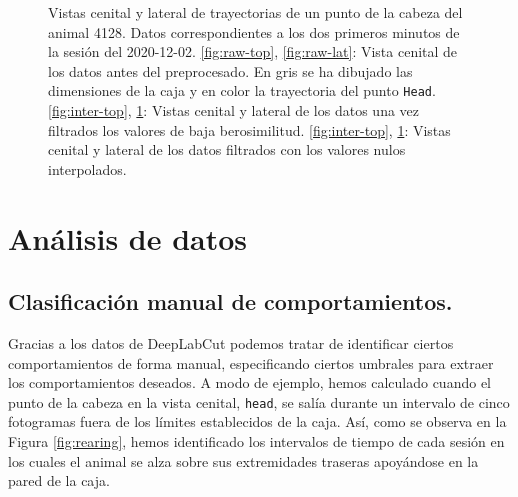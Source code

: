 \begin{figure}[p]
\begin{subfigure}{0.38\textwidth}
    \caption{}
    \label{fig:inter-lat}
  \end{subfigure}
  \caption[Trayectorias durante el preprocesamiento.]{Vistas cenital y lateral de trayectorias de un punto de la cabeza del animal 4128. Datos correspondientes a los dos primeros minutos de la sesión del 2020-12-02. \ref{fig:raw-top}, \ref{fig:raw-lat}: Vista cenital de los datos antes del preprocesado. En gris se ha dibujado las dimensiones de la caja y en color la trayectoria del punto \texttt{Head}. \ref{fig:inter-top}, \ref{fig:inter-lat}: Vistas cenital y lateral de los datos una vez filtrados los valores de baja berosimilitud. \ref{fig:inter-top}, \ref{fig:inter-lat}: Vistas cenital y lateral de los datos filtrados con los valores nulos interpolados. }
  \label{fig:interpolated-trayectories}
\end{figure}





\section{Análisis de datos} \label{sec:análisis}

\subsection{Clasificación manual de comportamientos.}
Gracias a los datos de DeepLabCut podemos tratar de identificar ciertos comportamientos de forma manual, especificando ciertos umbrales para extraer los comportamientos deseados. A modo de ejemplo, hemos calculado cuando el punto de la cabeza en la vista cenital, \texttt{head}, se salía durante un intervalo de cinco fotogramas fuera de los límites establecidos de la caja. Así, como se observa en la Figura \ref{fig:rearing}, hemos identificado los intervalos de tiempo de cada sesión en los cuales el animal se alza sobre sus extremidades traseras apoyándose en la pared de la caja.

